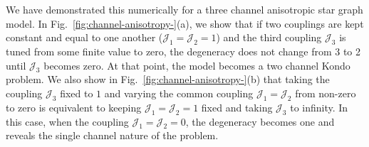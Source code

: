 \documentclass{iopart}
\begin{document}
We have demonstrated this numerically for a three channel anisotropic star graph model.
In Fig.~\ref{fig:channel-anisotropy-}(a), we show that if two couplings are kept constant and equal to one another (${\mathcal{J}}_1={\mathcal{J}}_2=1$) and the third coupling ${\mathcal{J}}_3$ is tuned from some finite value to zero, the degeneracy does not change from 3 to 2 until \(\mathcal{J}_3\) becomes zero. At that point, the model becomes a two channel Kondo problem. We also show in Fig.~\ref{fig:channel-anisotropy-}(b) that taking the coupling ${\mathcal{J}}_3$ fixed to $1$ and varying the common coupling ${\mathcal{J}}_1={\mathcal{J}}_2$ from non-zero to zero is equivalent to keeping ${\mathcal{J}}_1={\mathcal{J}}_2=1$ fixed and taking ${\mathcal{J}}_3$ to infinity. In this case, when the coupling ${\mathcal{J}}_1={\mathcal{J}}_2=0$, the degeneracy becomes one and reveals the single channel nature of the problem.
\end{document}
